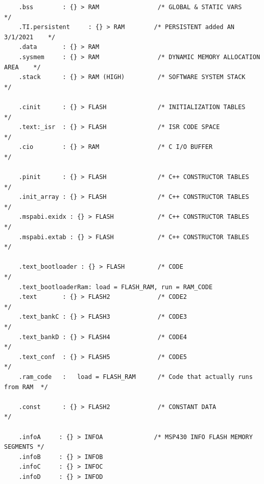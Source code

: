 \documentclass[LaM,binding=0.6cm,oneside]{../sapthesis}
\begin{document}
\begin{lstlisting}
    .bss        : {} > RAM                /* GLOBAL & STATIC VARS              */
    .TI.persistent     : {} > RAM        /* PERSISTENT added AN 3/1/2021    */
    .data       : {} > RAM
    .sysmem     : {} > RAM                /* DYNAMIC MEMORY ALLOCATION AREA    */
    .stack      : {} > RAM (HIGH)         /* SOFTWARE SYSTEM STACK             */

	.cinit      : {} > FLASH              /* INITIALIZATION TABLES             */
	.text:_isr  : {} > FLASH              /* ISR CODE SPACE                    */
    .cio        : {} > RAM                /* C I/O BUFFER                      */

    .pinit      : {} > FLASH              /* C++ CONSTRUCTOR TABLES            */
    .init_array : {} > FLASH              /* C++ CONSTRUCTOR TABLES            */
    .mspabi.exidx : {} > FLASH            /* C++ CONSTRUCTOR TABLES            */
    .mspabi.extab : {} > FLASH            /* C++ CONSTRUCTOR TABLES            */

    .text_bootloader : {} > FLASH		  /* CODE                              */
    .text_bootloaderRam: load = FLASH_RAM, run = RAM_CODE
    .text       : {} > FLASH2			  /* CODE2                             */
    .text_bankC : {} > FLASH3		      /* CODE3                             */
    .text_bankD : {} > FLASH4		      /* CODE4                             */
    .text_conf  : {} > FLASH5		  	  /* CODE5                             */
    .ram_code	:	load = FLASH_RAM	  /* Code that actually runs from RAM  */

    .const      : {} > FLASH2     		  /* CONSTANT DATA                     */

    .infoA     : {} > INFOA              /* MSP430 INFO FLASH MEMORY SEGMENTS */
    .infoB     : {} > INFOB
    .infoC     : {} > INFOC
    .infoD     : {} > INFOD




\end{lstlisting}
\end{document}
